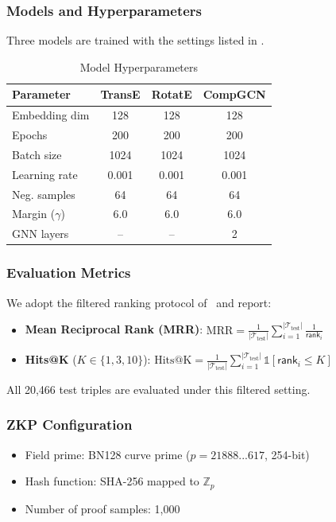 \documentclass[conference, 10pt]{IEEEtran}
\newcommand{\Z}{\mathbb{Z}}
\begin{document}
\subsubsection{Models and Hyperparameters}
Three models are trained with the settings listed in .

\begin{table}[h]
\centering
\caption{Model Hyperparameters}
\label{tab:hyperparams}
\begin{tabular}{lccc}
\toprule
\textbf{Parameter} & \textbf{TransE} & \textbf{RotatE} & \textbf{CompGCN} \\
\midrule
Embedding dim & 128 & 128 & 128 \\
Epochs & 200 & 200 & 200 \\
Batch size & 1024 & 1024 & 1024 \\
Learning rate & 0.001 & 0.001 & 0.001 \\
Neg. samples & 64 & 64 & 64 \\
Margin ($\gamma$) & 6.0 & 6.0 & 6.0 \\
GNN layers & -- & -- & 2 \\
\bottomrule
\end{tabular}
\end{table}

\subsubsection{Evaluation Metrics}
We adopt the filtered ranking protocol of~\cite{bordes2013translating} and report:
\begin{itemize}
    \item \textbf{Mean Reciprocal Rank (MRR)}: $\text{MRR} = \frac{1}{|\mathcal{T}_{\text{test}}|} \sum_{i=1}^{|\mathcal{T}_{\text{test}}|} \frac{1}{\mathsf{rank}_i}$
    \item \textbf{Hits@K} ($K \in \{1, 3, 10\}$): $\text{Hits@K} = \frac{1}{|\mathcal{T}_{\text{test}}|} \sum_{i=1}^{|\mathcal{T}_{\text{test}}|} \mathbb{1}[\mathsf{rank}_i \leq K]$
\end{itemize}

All 20,466 test triples are evaluated under this filtered setting.

\subsubsection{ZKP Configuration}
\begin{itemize}
    \item Field prime: BN128 curve prime ($p = 21888...617$, 254-bit)
    \item Hash function: SHA-256 mapped to $\Z_p$
    \item Number of proof samples: 1,000
\end{itemize}
\end{document}
